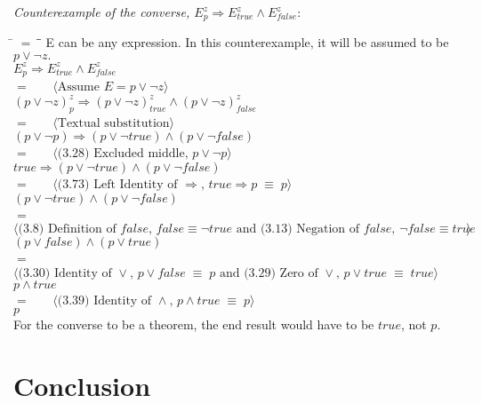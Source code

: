 \documentclass[12pt, fleqn, leqno]{article}
\newcommand{\lgap}{2pt}                             %
\newcommand{\mymathindent}{24pt}                    %
\newcommand{\equivs}{\ensuremath{\;\equiv\;}}       %
\newcommand{\impl}{\ensuremath{\Rightarrow}}        %
\newcommand{\myqedtab}{\hspace{384pt}}              %
\newcommand{\Gll} {\langle}                         %
\newcommand{\Ggg} {\rangle}                         %
\newcommand{\Hint}[1]     {\ \ \ $\Gll              \mbox{#1} \Ggg$ }   %
\begin{document}
\emph{Counterexample of the converse, $E^{z}_{p} \impl E^{z}_{true}\land E^{z}_{false}$}:

\begin{tabbing}
\hspace{\mymathindent} \= $= \;$ \= \myqedtab \= \kill
E can be any expression. In this counterexample, it will be assumed to be $p \lor\lnot z.$\\
	\> \>  $E^{z}_{p} \impl E^{z}_{true}\land E^{z}_{false}$\\
	\> $=$  \>  \Hint{Assume $E = p \lor \lnot z$}\\[\lgap]
	\> \>  $(p \lor\lnot z)^{z}_{p} \impl (p \lor\lnot z)^{z}_{true}\land (p \lor\lnot z)^{z}_{false}$\\
	\> $=$  \>  \Hint{Textual substitution}\\[\lgap]
	\> \>  $(p \lor\lnot p) \impl (p \lor\lnot true)\land (p \lor\lnot false)$\\
	\> $=$  \>  \Hint{(3.28) Excluded middle, $p \lor \lnot p$}\\[\lgap]
	\> \>  $true \impl (p \lor\lnot true)\land (p \lor\lnot false)$\\
	\> $=$  \>  \Hint{(3.73) Left Identity of $\impl$, $true \impl p \equivs p$}\\[\lgap]
	\> \>  $(p \lor\lnot true)\land (p \lor\lnot false)$\\
	\> $=$  \>  \Hint{(3.8) Definition of $false$, $false \equiv \lnot true$ and (3.13) Negation of $false$, $\lnot false \equiv true$}\\[\lgap]
	\> \>  $(p \lor false)\land (p \lor true)$\\
	\> $=$  \>  \Hint{(3.30) Identity of $\lor$, $p \lor false \equivs p$ and (3.29) Zero of $\lor$, $p \lor true \equivs true$}\\[\lgap]
	\> \>  $p\land true$\\
	\> $=$  \>  \Hint{(3.39) Identity of $\land$, $p \land true \equivs p$}\\[\lgap]
	\> \>  $p$ \quad \\ For the converse to be a theorem, the end result would have to be $true$, not $p$.

\end{tabbing}

\section{Conclusion}



\end{document}
